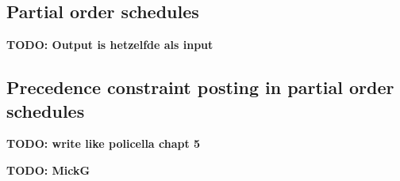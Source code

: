 \documentclass{article}
\newcommand{\TODO}[1]{{\color{red}\textbf{TODO: #1}}}
\begin{document}
\subsection{Partial order schedules}
\TODO{Output is hetzelfde als input}
%

\subsection{Precedence constraint posting in partial order schedules}
\TODO{write like policella chapt 5}

\TODO{MickG}
\end{document}
